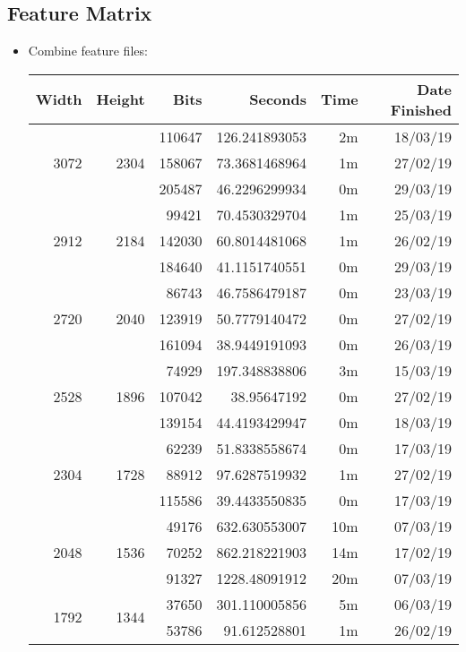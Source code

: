 \subsection{Feature Matrix}
\begin{itemize}
  \item Combine feature files:
  \begin{center}
  \begin{tabular}{ r r r | r r r }
  Width & Height & Bits & Seconds & Time & Date Finished \\ \hline
  \multirow{3}{*}{3072} & \multirow{3}{*}{2304} & 110647 & 126.241893053 & 2m & 18/03/19 \\
  & & 158067 & 73.3681468964 & 1m & 27/02/19 \\
  & & 205487 & 46.2296299934 & 0m & 29/03/19 \\
  \hline
  \multirow{3}{*}{2912} & \multirow{3}{*}{2184} & 99421 & 70.4530329704 & 1m & 25/03/19 \\
  & & 142030 & 60.8014481068 & 1m & 26/02/19 \\
  & & 184640 & 41.1151740551 & 0m & 29/03/19 \\
  \hline
  \multirow{3}{*}{2720} & \multirow{3}{*}{2040} & 86743 & 46.7586479187 & 0m & 23/03/19 \\
  & & 123919 & 50.7779140472 & 0m & 27/02/19 \\
  & & 161094 & 38.9449191093 & 0m & 26/03/19 \\
  \hline
  \multirow{3}{*}{2528} & \multirow{3}{*}{1896} & 74929 & 197.348838806 & 3m & 15/03/19 \\
  & & 107042 & 38.95647192 & 0m & 27/02/19 \\
  & & 139154 & 44.4193429947 & 0m & 18/03/19 \\
  \hline
  \multirow{3}{*}{2304} & \multirow{3}{*}{1728} & 62239 & 51.8338558674 & 0m & 17/03/19 \\
  & & 88912 & 97.6287519932 & 1m & 27/02/19 \\
  & & 115586 & 39.4433550835 & 0m & 17/03/19 \\
  \hline
  \multirow{3}{*}{2048} & \multirow{3}{*}{1536} & 49176 & 632.630553007 & 10m & 07/03/19 \\
  & & 70252 & 862.218221903 & 14m & 17/02/19 \\
  & & 91327 & 1228.48091912 & 20m & 07/03/19 \\
  \hline
  \multirow{3}{*}{1792} & \multirow{3}{*}{1344} & 37650 & 301.110005856 & 5m & 06/03/19 \\
  & & 53786 & 91.612528801 & 1m & 26/02/19 \\

\end{tabular}
\end{center}
\end{itemize}
